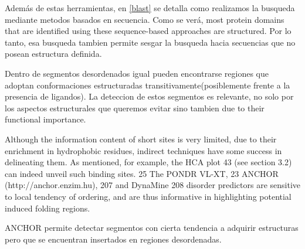 Además de estas herramientas, en \ref{blast} se detalla como realizamos la busqueda mediante metodos basados en secuencia. 
Como se verá, most protein domains that are identified using these sequence-based approaches are structured.
Por lo tanto, esa busqueda tambien permite sesgar la busqueda hacia secuencias que no posean estructura definida.








Dentro de segmentos desordenados igual pueden encontrarse regiones que adoptan conformaciones estructuradas transitivamente(posiblemente frente a la presencia de ligandos).
La deteccion de estos segmentos es relevante, no solo por los aspectos estructurales que queremos evitar %
sino tambien due to their functional importance. %

Although the information content of short sites is very limited, due to their enrichment in hydrophobic residues, indirect techniques have
some success in delineating them. As mentioned, for example, the HCA plot 43 (see section 3.2) can indeed unveil such binding
sites. 25 The PONDR VL-XT, 23 ANCHOR (http://anchor.enzim.hu), 207 and DynaMine 208 disorder predictors are sensitive
to local tendency of ordering, and are thus informative in highlighting potential induced folding regions.



ANCHOR permite detectar segmentos con cierta tendencia a adquirir estructuras pero que se encuentran insertados en regiones desordenadas.








